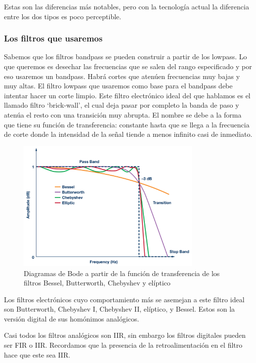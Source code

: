 Estas son las diferencias más notables, pero con la tecnología actual la diferencia entre los dos tipos es poco perceptible.


\subsubsection{Los filtros que usaremos} %

Sabemos que los filtros bandpass se pueden construir a partir de los lowpass. Lo que queremos es desechar las frecuencias que se salen del rango especificado y por eso usaremos un bandpass. Habrá cortes que atenúen frecuencias muy bajas y muy altas. El filtro lowpass que usaremos como base para el bandpass debe intentar hacer un corte limpio. Este filtro electrónico ideal del que hablamos es el llamado filtro ‘brick-wall’, el cual deja pasar por completo la banda de paso y atenúa el resto con una transición muy abrupta. El nombre se debe a la forma que tiene su función de transferencia: constante hasta que se llega a la frecuencia de corte donde la intensidad de la señal tiende a menos infinito casi de inmediato. 

\begin{figure}[th]
\centering
\includegraphics[width=9cm]{Figures/4filters}
\decoRule
\caption[4filters]{Diagramas de Bode a partir de la función de transferencia de los filtros Bessel, Butterworth, Chebyshev y elíptico}
\label{fig:4filters}
\end{figure}

Los filtros electrónicos cuyo comportamiento más se asemejan a este filtro ideal son Butterworth, Chebyshev I, Chebyshev II, elíptico, y Bessel. Estos son la versión digital de sus homónimos analógicos.

Casi todos los filtros analógicos son IIR, sin embargo los filtros digitales pueden ser FIR o IIR. Recordamos que la presencia de la retroalimentación en el filtro hace que este sea IIR. \\

